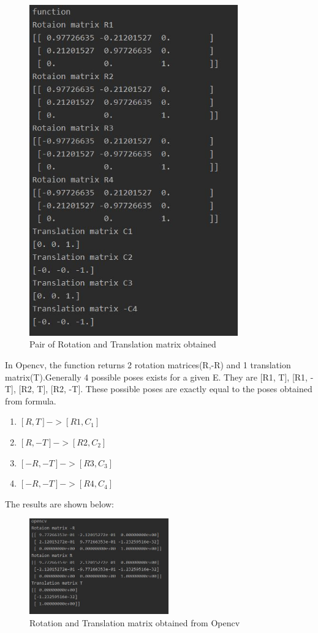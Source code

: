 \documentclass[12pt]{article}
\begin{document}
\begin{figure}[h]
    \centering
    \includegraphics[width=9cm]{came}
    \caption{Pair of Rotation and Translation matrix obtained}
    \label{fig:Pair of Rotation and Translation matrix obtained}
\end{figure}
\newline
In Opencv, the function returns 2 rotation matrices(R,-R) and 1 translation matrix(T).Generally 4 possible poses exists for a given E. They are [R1, T], [R1, -T], [R2, T], [R2, -T]. These possible poses are exactly equal to the poses obtained from formula. 
\begin{enumerate}
\item  $[R, T]  ->   [R1, C_1]$
\item  $[R, -T]  ->  [R2, C_2]$
\item  $[-R, -T]  -> [R3, C_3]$
\item  $[-R, -T]  -> [R4, C_4]$
\end{enumerate}
The results are shown below:
\begin{figure}[h]
    \centering
    \includegraphics[width=6cm]{came1}
    \caption{Rotation and Translation matrix obtained from Opencv}
    \label{fig:Rotation and Translation matrix obtained from Opencv}
\end{figure}
\end{document}
